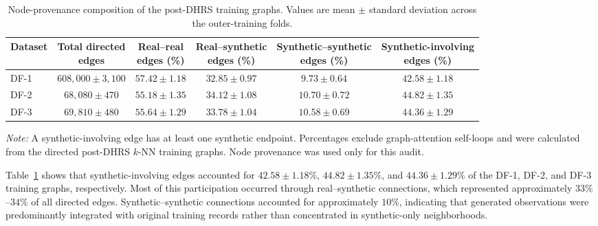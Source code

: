 \documentclass[pdflatex,sn-mathphys-num]{sn-jnl}%
\theoremstyle{thmstyleone}%
\theoremstyle{thmstyletwo}%
\theoremstyle{thmstylethree}%
\begin{document}
\begin{table}[!ht]
\centering
\caption{
Node-provenance composition of the post-DHRS training graphs. Values are
mean \(\pm\) standard deviation across the outer-training folds.
}
\label{tab:synthetic_edge_audit}
\scriptsize
\setlength{\tabcolsep}{4pt}
\renewcommand{\arraystretch}{1.07}
\begin{tabular}{@{}lccccc@{}}
\toprule
\textbf{Dataset} &
\shortstack{\textbf{Total directed}\\\textbf{edges}} &
\shortstack{\textbf{Real--real}\\\textbf{edges (\%)}} &
\shortstack{\textbf{Real--synthetic}\\\textbf{edges (\%)}} &
\shortstack{\textbf{Synthetic--synthetic}\\\textbf{edges (\%)}} &
\shortstack{\textbf{Synthetic-involving}\\\textbf{edges (\%)}} \\
\midrule

DF-1 &
$608{,}000\pm3{,}100$ &
$57.42\pm1.18$ &
$32.85\pm0.97$ &
$9.73\pm0.64$ &
$42.58\pm1.18$ \\

DF-2 &
$68{,}080\pm470$ &
$55.18\pm1.35$ &
$34.12\pm1.08$ &
$10.70\pm0.72$ &
$44.82\pm1.35$ \\

DF-3 &
$69{,}810\pm480$ &
$55.64\pm1.29$ &
$33.78\pm1.04$ &
$10.58\pm0.69$ &
$44.36\pm1.29$ \\

\bottomrule
\end{tabular}

\vspace{2pt}
\begin{minipage}{0.97\textwidth}
\footnotesize
\textit{Note:} A synthetic-involving edge has at least one synthetic endpoint.
Percentages exclude graph-attention self-loops and were calculated from the
directed post-DHRS \(k\)-NN training graphs. Node provenance was used only for
this audit.
\end{minipage}
\end{table}
\endgroup

 {
Table~\ref{tab:synthetic_edge_audit} shows that synthetic-involving edges
accounted for \(42.58\pm1.18\%\), \(44.82\pm1.35\%\), and
\(44.36\pm1.29\%\) of the DF-1, DF-2, and DF-3 training graphs,
respectively. Most of this participation occurred through real--synthetic
connections, which represented approximately \(33\%\)--\(34\%\) of all
directed edges. Synthetic--synthetic connections accounted for approximately
\(10\%\), indicating that generated observations were predominantly integrated
with original training records rather than concentrated in synthetic-only
neighborhoods.
}
\end{document}
